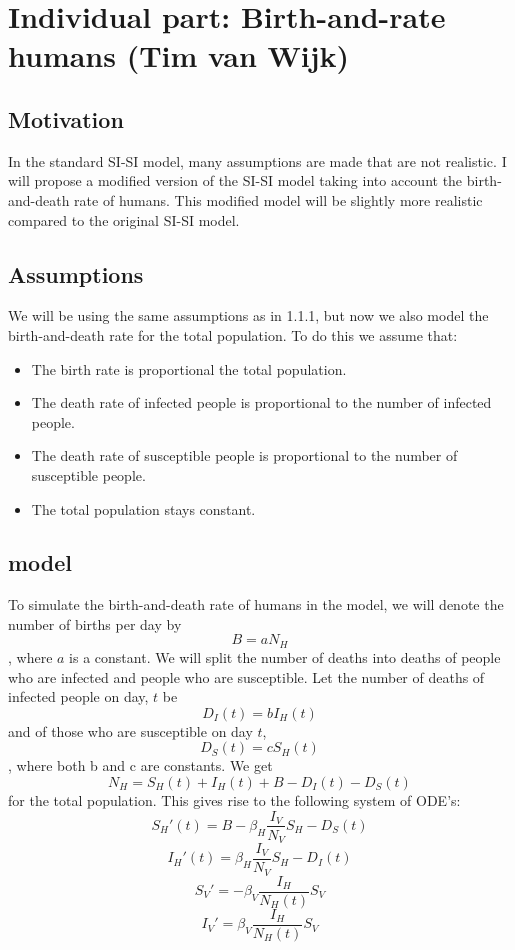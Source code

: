 \section{Individual part: Birth-and-rate humans (Tim van Wijk)}

\subsection*{Motivation}
In the standard SI-SI model, many assumptions are made that are not realistic. I will propose a modified version of the SI-SI model taking into account the birth-and-death rate of humans. This modified model will be slightly more realistic compared to the original SI-SI model.

\subsection*{Assumptions}
We will be using the same assumptions as in 1.1.1, but now we also model the birth-and-death rate for the total population. To do this we assume that:
\begin{itemize}
 \item The birth rate is proportional the total population. 
 \item The death rate of infected people is proportional to the number of infected people.
 \item The death rate of susceptible people is proportional to the number of susceptible people.
 \item The total population stays constant.
\end{itemize}
\subsection*{model}
To simulate the birth-and-death rate of humans in the model, we will denote the number of births per day by $$B = aN_H$$, where $a$ is a constant. We will split the number of deaths into deaths of people who are infected and people who are susceptible. Let the number of deaths of infected people on day, $t$ be $$D_I(t) = b I_H(t)$$ and of those who are susceptible on day $t$, $$D_S(t) = cS_H(t)$$, where both b and c are constants. We  get $$N_H=S_H(t) + I_H(t) + B-D_I(t) -D_S(t)$$ for the total population. This gives rise to the following system of ODE's:
\begin{equation}
S_H'(t) = B -\beta_H \frac{I_V}{N_V} S_H - D_S(t) 
\end{equation}
\begin{equation}
I_H'(t) = \beta_H \frac{I_V}{N_V} S_H - D_I(t)
\end{equation}
\begin{equation}
S_V' = -\beta_V \frac{I_H}{N_H(t)} S_V
\end{equation}
\begin{equation}
I_V' = \beta_V \frac{I_H}{N_H(t)} S_V
\end{equation}